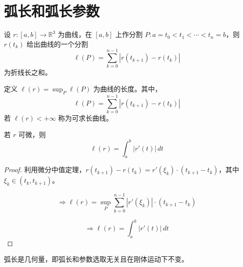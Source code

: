 \documentclass[lang=cn,10pt,thmcnt=section]{elegantbook}
\begin{document}
\section{弧长和弧长参数}
\begin{definition}[弧长]
    设 $r:[a,b] \rightarrow \mathbb{R}^3$ 为曲线，在 $[a,b]$ 上作分割 $P: a = t_0 < t_1 < \cdots < t_n = b$，则 $r(t_k)$ 给出曲线的一个分割
    \[
    \ell(P) = \sum_{k=0}^{n-1} |r(t_{k+1}) - r(t_k)|
    \]
    为折线长之和。
\end{definition}
\begin{definition}[曲线的弧长]
    定义 $\ell(r) = \sup_P \ell(P)$ 为曲线的长度。其中，
    \[
    \ell(P) = \sum_{k=0}^{n-1} |r(t_{k+1}) - r(t_k)|
    \]
    若 $\ell(r) < +\infty$ 称为可求长曲线。
    
    \begin{remark}
        若 $r$ 可微，则
    \[
    \ell(r) = \int_a^b |r'(t)| \, dt
    \]
    \end{remark}
    \end{definition}
    
\begin{proof}
    利用微分中值定理，$r(t_{k+1}) - r(t_k) = r'(\xi_k) \cdot (t_{k+1} - t_k)$，其中 $\xi_k \in (t_k, t_{k+1})$。
    
    \[
    \Rightarrow \ell(r) = \sup_P \sum_{k=0}^{n-1} |r'(\xi_k)| \cdot (t_{k+1} - t_k)
    \]
    
    \[
    \Rightarrow \ell(r) = \int_a^b |r'(t)| \, dt
    \]
\end{proof}
\begin{theorem}[弧长是几何量]
    弧长是几何量，即弧长和参数选取无关且在刚体运动下不变。
    \end{theorem}
    
\end{document}
